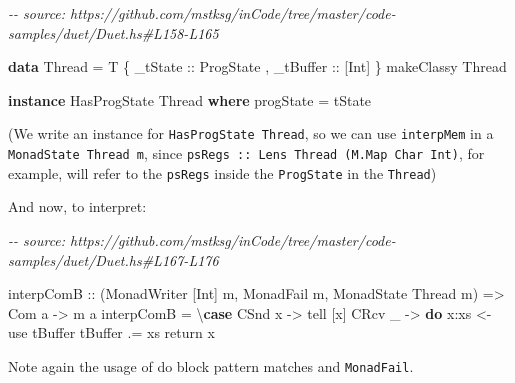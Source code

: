 \documentclass[]{article}
\newenvironment{Shaded}{}{}
\newcommand{\CommentTok}[1]{\textcolor[rgb]{0.38,0.63,0.69}{\textit{#1}}}
\newcommand{\DataTypeTok}[1]{\textcolor[rgb]{0.56,0.13,0.00}{#1}}
\newcommand{\FunctionTok}[1]{\textcolor[rgb]{0.02,0.16,0.49}{#1}}
\newcommand{\KeywordTok}[1]{\textcolor[rgb]{0.00,0.44,0.13}{\textbf{#1}}}
\newcommand{\NormalTok}[1]{#1}
\newcommand{\OperatorTok}[1]{\textcolor[rgb]{0.40,0.40,0.40}{#1}}
\newcommand{\OtherTok}[1]{\textcolor[rgb]{0.00,0.44,0.13}{#1}}
\begin{document}
\begin{Shaded}
\begin{Highlighting}[]
\CommentTok{{-}{-} source: https://github.com/mstksg/inCode/tree/master/code{-}samples/duet/Duet.hs\#L158{-}L165}

\KeywordTok{data} \DataTypeTok{Thread} \OtherTok{=} \DataTypeTok{T}
\NormalTok{    \{}\OtherTok{ \_tState   ::} \DataTypeTok{ProgState}
\NormalTok{    ,}\OtherTok{ \_tBuffer  ::}\NormalTok{ [}\DataTypeTok{Int}\NormalTok{]}
\NormalTok{    \}}
\NormalTok{makeClassy \textquotesingle{}}\DataTypeTok{\textquotesingle{}Thread}

\KeywordTok{instance} \DataTypeTok{HasProgState} \DataTypeTok{Thread} \KeywordTok{where}
\NormalTok{    progState }\OtherTok{=}\NormalTok{ tState}
\end{Highlighting}
\end{Shaded}

(We write an instance for \texttt{HasProgState\ Thread}, so we can use
\texttt{interpMem} in a \texttt{MonadState\ Thread\ m}, since
\texttt{psRegs\ ::\ Lens\textquotesingle{}\ Thread\ (M.Map\ Char\ Int)}, for
example, will refer to the \texttt{psRegs} inside the \texttt{ProgState} in the
\texttt{Thread})

And now, to interpret:

\begin{Shaded}
\begin{Highlighting}[]
\CommentTok{{-}{-} source: https://github.com/mstksg/inCode/tree/master/code{-}samples/duet/Duet.hs\#L167{-}L176}

\NormalTok{interpComB}
\OtherTok{    ::}\NormalTok{ (}\DataTypeTok{MonadWriter}\NormalTok{ [}\DataTypeTok{Int}\NormalTok{] m, }\DataTypeTok{MonadFail}\NormalTok{ m, }\DataTypeTok{MonadState} \DataTypeTok{Thread}\NormalTok{ m)}
    \OtherTok{=\textgreater{}} \DataTypeTok{Com}\NormalTok{ a}
    \OtherTok{{-}\textgreater{}}\NormalTok{ m a}
\NormalTok{interpComB }\OtherTok{=}\NormalTok{ \textbackslash{}}\KeywordTok{case}
    \DataTypeTok{CSnd}\NormalTok{ x }\OtherTok{{-}\textgreater{}}\NormalTok{ tell [x]}
    \DataTypeTok{CRcv}\NormalTok{ \_ }\OtherTok{{-}\textgreater{}} \KeywordTok{do}
\NormalTok{      x}\OperatorTok{:}\NormalTok{xs }\OtherTok{\textless{}{-}}\NormalTok{ use tBuffer}
\NormalTok{      tBuffer }\OperatorTok{.=}\NormalTok{ xs}
      \FunctionTok{return}\NormalTok{ x}
\end{Highlighting}
\end{Shaded}

Note again the usage of do block pattern matches and \texttt{MonadFail}.
\end{document}
